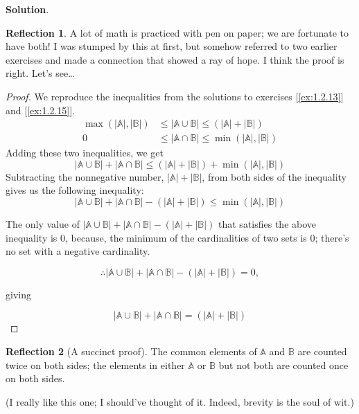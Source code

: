 \documentclass[11pt]{book}
\theoremstyle{definition}
\theoremstyle{plain}
\theoremstyle{definition}
\theoremstyle{problemstyle}
\theoremstyle{remark}
\theoremstyle{definition}
\newtheorem{reflection}{Reflection}
\begin{document}
\textbf{Solution}.
\begin{reflection}
    A lot of math is practiced with pen on paper; we are fortunate to have both! I was stumped by this at first, but somehow referred to two earlier exercises and made a connection that showed a ray of hope. I think the proof is right. Let's see\dots
\end{reflection}
\begin{proof}
    We reproduce the inequalities from the solutions to exercises [\ref{ex:1.2.13}] and [\ref{ex:1.2.15}].
    \begin{align*}
        \max(\lvert\mathbb{A}\rvert,\lvert\mathbb{B}\rvert)&\leq\lvert\mathbb{\mathbb{A}\cup\mathbb{B}}\rvert\leq(\lvert\mathbb{A}\rvert+\lvert\mathbb{B}\rvert)\\
        0&\leq\lvert\mathbb{A}\cap\mathbb{B}\rvert\leq\min(\lvert\mathbb{A}\rvert,\lvert\mathbb{B}\rvert)
    \end{align*}
    Adding these two inequalities, we get
    \begin{equation*}
        \lvert\mathbb{\mathbb{A}\cup\mathbb{B}}\rvert+\lvert\mathbb{A}\cap\mathbb{B}\rvert\leq(\lvert\mathbb{A}\rvert+\lvert\mathbb{B}\rvert)+\min(\lvert\mathbb{A}\rvert,\lvert\mathbb{B}\rvert)
    \end{equation*}
    Subtracting the nonnegative number, $\lvert\mathbb{A}\rvert+\lvert\mathbb{B}\rvert$, from both sides of the inequality gives us the following inequality:
    \begin{equation*}
        \lvert\mathbb{\mathbb{A}\cup\mathbb{B}}\rvert+\lvert\mathbb{A}\cap\mathbb{B}\rvert-(\lvert\mathbb{A}\rvert+\lvert\mathbb{B}\rvert)\leq\min(\lvert\mathbb{A}\rvert,\lvert\mathbb{B}\rvert)
    \end{equation*}

    The only value of $\lvert\mathbb{\mathbb{A}\cup\mathbb{B}}\rvert+\lvert\mathbb{A}\cap\mathbb{B}\rvert-(\lvert\mathbb{A}\rvert+\lvert\mathbb{B}\rvert)$ that satisfies the above inequality is $0$, because, the minimum of the cardinalities of two sets is 0; there's no set with a negative cardinality.

    \[
        \therefore \lvert\mathbb{\mathbb{A}\cup\mathbb{B}}\rvert+\lvert\mathbb{A}\cap\mathbb{B}\rvert-(\lvert\mathbb{A}\rvert+\lvert\mathbb{B}\rvert)=0,
    \]

    giving 

    \[
        \lvert\mathbb{\mathbb{A}\cup\mathbb{B}}\rvert+\lvert\mathbb{A}\cap\mathbb{B}\rvert=(\lvert\mathbb{A}\rvert+\lvert\mathbb{B}\rvert)
    \]

\end{proof}
\begin{reflection}[A succinct proof]
    The common elements of $\mathbb{A}$ and $\mathbb{B}$ are counted twice on both sides; the elements in either $\mathbb{A}$ or $\mathbb{B}$ but not both are counted once on both sides.

    (I really like this one; I should've thought of it. Indeed, brevity is the soul of wit.)
\end{reflection}
\end{document}
